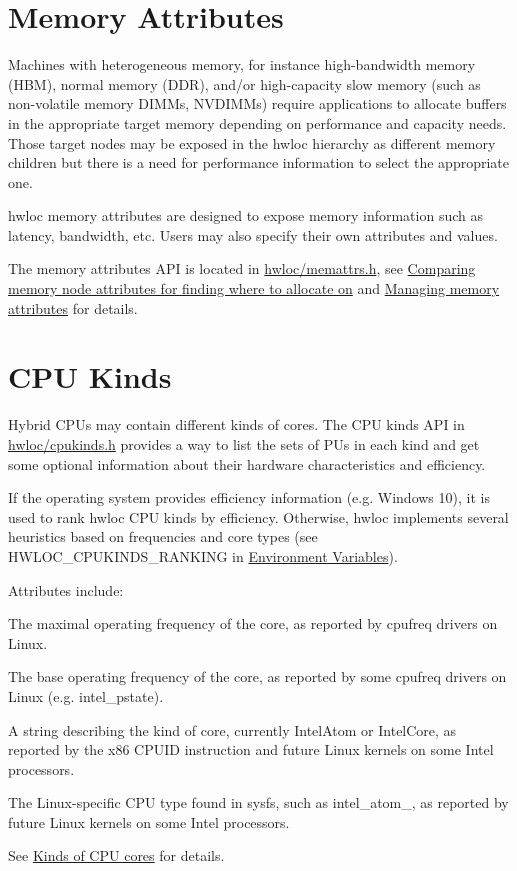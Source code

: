  \hypertarget{a00387_topoattrs_memattrs}{}\section{Memory Attributes}\label{a00387_topoattrs_memattrs}
Machines with heterogeneous memory, for instance high-\/bandwidth memory (H\+BM), normal memory (D\+DR), and/or high-\/capacity slow memory (such as non-\/volatile memory D\+I\+M\+Ms, N\+V\+D\+I\+M\+Ms) require applications to allocate buffers in the appropriate target memory depending on performance and capacity needs. Those target nodes may be exposed in the hwloc hierarchy as different memory children but there is a need for performance information to select the appropriate one.

hwloc memory attributes are designed to expose memory information such as latency, bandwidth, etc. Users may also specify their own attributes and values.

The memory attributes A\+PI is located in \hyperlink{a00134_source}{hwloc/memattrs.\+h}, see \hyperlink{a00211}{Comparing memory node attributes for finding where to allocate on} and \hyperlink{a00212}{Managing memory attributes} for details.

 \hypertarget{a00387_topoattrs_cpukinds}{}\section{C\+P\+U Kinds}\label{a00387_topoattrs_cpukinds}
Hybrid C\+P\+Us may contain different kinds of cores. The C\+PU kinds A\+PI in \hyperlink{a00137_source}{hwloc/cpukinds.\+h} provides a way to list the sets of P\+Us in each kind and get some optional information about their hardware characteristics and efficiency.

If the operating system provides efficiency information (e.\+g. Windows 10), it is used to rank hwloc C\+PU kinds by efficiency. Otherwise, hwloc implements several heuristics based on frequencies and core types (see H\+W\+L\+O\+C\+\_\+\+C\+P\+U\+K\+I\+N\+D\+S\+\_\+\+R\+A\+N\+K\+I\+NG in \hyperlink{a00382}{Environment Variables}).

Attributes include\+: 
\begin{DoxyDescription}
\item[Frequency\+Max\+M\+Hz (Linux) ]The maximal operating frequency of the core, as reported by {\ttfamily cpufreq} drivers on Linux.  
\item[Frequency\+Base\+M\+Hz (Linux) ]The base operating frequency of the core, as reported by some {\ttfamily cpufreq} drivers on Linux (e.\+g. {\ttfamily intel\+\_\+pstate}).  
\item[Core\+Type (x86, Linux) ]A string describing the kind of core, currently {\ttfamily Intel\+Atom} or {\ttfamily Intel\+Core}, as reported by the x86 C\+P\+U\+ID instruction and future Linux kernels on some Intel processors.  
\item[Linux\+C\+P\+U\+Type (Linux) ]The Linux-\/specific C\+PU type found in sysfs, such as {\ttfamily intel\+\_\+atom\+\_}, as reported by future Linux kernels on some Intel processors.  
\end{DoxyDescription}

See \hyperlink{a00213}{Kinds of C\+PU cores} for details. 
